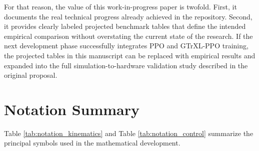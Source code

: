 \documentclass[10pt,twocolumn]{article}
\begin{document}
For that reason, the value of this work-in-progress paper is twofold. First, it documents the real technical progress already achieved in the repository. Second, it provides clearly labeled projected benchmark tables that define the intended empirical comparison without overstating the current state of the research. If the next development phase successfully integrates PPO and GTrXL-PPO training, the projected tables in this manuscript can be replaced with empirical results and expanded into the full simulation-to-hardware validation study described in the original proposal.

\section{Notation Summary}
\label{sec:notation_summary}

Table \ref{tab:notation_kinematics} and Table \ref{tab:notation_control} summarize the principal symbols used in the mathematical development.
\end{document}
